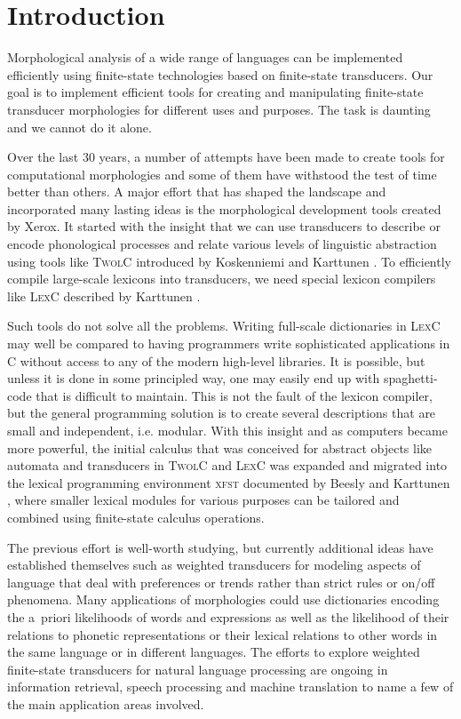 \documentclass[postprint]{flammie}
\begin{document}
\section{Introduction}

Morphological analysis of a wide range of languages can be implemented
efficiently using finite-state technologies based on finite-state
transducers. Our goal is to implement efficient tools for creating and
manipulating finite-state transducer morphologies for different uses
and purposes. The task is daunting and we cannot do it alone.

Over the last 30 years, a number of attempts have been made to create
tools for computational morphologies and some of them have withstood
the test of time better than others. A major effort that has shaped
the landscape and incorporated many lasting ideas is the morphological
development tools created by Xerox. It started with the insight that
we can use transducers to describe or encode phonological processes
and relate various levels of linguistic abstraction using tools like
\textsc{TwolC} introduced by Koskenniemi and Karttunen
\cite{Koskenniemi83,Karttunen87,Karttunen92}. To efficiently compile
large-scale lexicons into transducers, we need special lexicon
compilers like \textsc{LexC} described by Karttunen
\cite{Karttunen93,Karttunen94}.

Such tools do not solve all the problems. Writing full-scale
dictionaries in \textsc{LexC} may well be compared to having
programmers write sophisticated applications in C without access to
any of the modern high-level libraries. It is possible, but unless it
is done in some principled way, one may easily end up with
spaghetti-code that is difficult to maintain. This is not the fault of
the lexicon compiler, but the general programming solution is to
create several descriptions that are small and independent,
i.e. modular.  With this insight and as computers became more
powerful, the initial calculus that was conceived for abstract objects
like automata and transducers in \textsc{TwolC} and \textsc{LexC} was
expanded and migrated into the lexical programming environment
\textsc{xfst} documented by Beesly and Karttunen \cite{beesley03},
where smaller lexical modules for various purposes can be tailored and
combined using finite-state calculus operations.

The previous effort is well-worth studying, but currently additional
ideas have established themselves such as weighted transducers for
modeling aspects of language that deal with preferences or trends
rather than strict rules or on/off phenomena. Many applications of
morphologies could use dictionaries encoding the a~priori likelihoods
of words and expressions as well as the likelihood of their relations
to phonetic representations or their lexical relations to other words
in the same language or in different languages. The efforts to explore
weighted finite-state transducers for natural language processing are
ongoing in information retrieval, speech processing and machine
translation to name a few of the main application areas involved.
\end{document}
